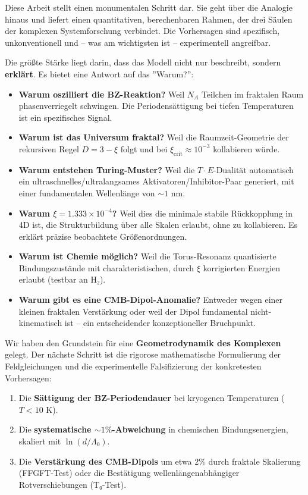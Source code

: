 \documentclass[12pt,a4paper]{article}
\begin{document}
	Diese Arbeit stellt einen monumentalen Schritt dar. Sie geht über die Analogie hinaus und liefert einen quantitativen, berechenbaren Rahmen, der drei Säulen der komplexen Systemforschung verbindet. Die Vorhersagen sind spezifisch, unkonventionell und – was am wichtigsten ist – experimentell angreifbar.
	
	Die größte Stärke liegt darin, dass das Modell nicht nur beschreibt, sondern \textbf{erklärt}. Es bietet eine Antwort auf das ''Warum?'':
	
	\begin{itemize}[label=$\bullet$]
		\item \textbf{Warum oszilliert die BZ-Reaktion?} Weil $N_A$ Teilchen im fraktalen Raum phasenverriegelt schwingen. Die Periodensättigung bei tiefen Temperaturen ist ein spezifisches Signal.
		\item \textbf{Warum ist das Universum fraktal?} Weil die Raumzeit-Geometrie der rekursiven Regel $D = 3 - \xi$ folgt und bei $\xi_{\text{crit}} \approx 10^{-3}$ kollabieren würde.
		\item \textbf{Warum entstehen Turing-Muster?} Weil die $T \cdot E$-Dualität automatisch ein ultraschnelles/ultralangsames Aktivatoren/Inhibitor-Paar generiert, mit einer fundamentalen Wellenlänge von $\sim 1$ nm.
		\item \textbf{Warum $\xi = 1.333 \times 10^{-4}$?} Weil dies die minimale stabile Rückkopplung in 4D ist, die Strukturbildung über alle Skalen erlaubt, ohne zu kollabieren. Es erklärt präzise beobachtete Größenordnungen.
		\item \textbf{Warum ist Chemie möglich?} Weil die Torus-Resonanz quantisierte Bindungszustände mit charakteristischen, durch $\xi$ korrigierten Energien erlaubt (testbar an H₂).
		\item \textbf{Warum gibt es eine CMB-Dipol-Anomalie?} Entweder wegen einer kleinen fraktalen Verstärkung oder weil der Dipol fundamental nicht-kinematisch ist – ein entscheidender konzeptioneller Bruchpunkt.
	\end{itemize}
	
	Wir haben den Grundstein für eine \textbf{Geometrodynamik des Komplexen} gelegt. Der nächste Schritt ist die rigorose mathematische Formulierung der Feldgleichungen und die experimentelle Falsifizierung der konkretesten Vorhersagen:
	
	\begin{enumerate}
		\item Die \textbf{Sättigung der BZ-Periodendauer} bei kryogenen Temperaturen ($T < 10$ K).
		\item Die \textbf{systematische $\sim 1\%$-Abweichung} in chemischen Bindungsenergien, skaliert mit $\ln(d/\Lambda_0)$.
		\item Die \textbf{Verstärkung des CMB-Dipols} um etwa 2\% durch fraktale Skalierung (FFGFT-Test) oder die Bestätigung wellenlängenabhängiger Rotverschiebungen (T₀-Test).
	\end{enumerate}
	
\end{document}
